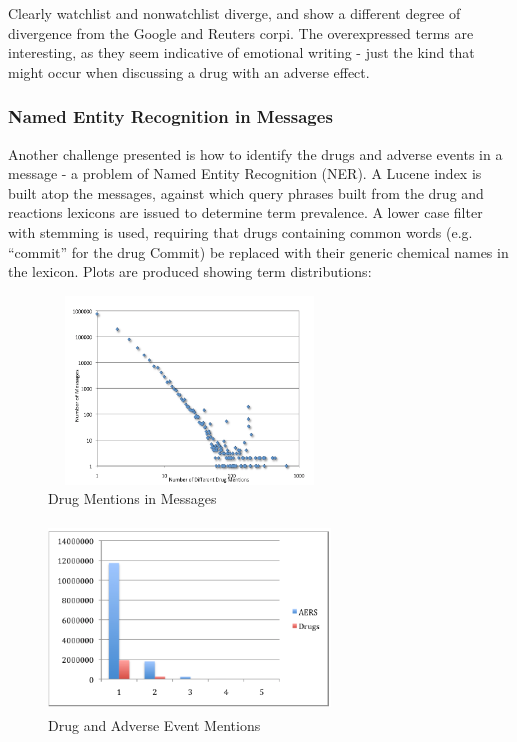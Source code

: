 \documentclass[twoside,11pt]{article}
\begin{document}
Clearly watchlist and nonwatchlist diverge, and show a different degree of divergence from the Google and Reuters corpi. The overexpressed terms are interesting, as they seem indicative of emotional writing - just the kind that might occur when discussing a drug with an adverse effect.

\subsubsection{Named Entity Recognition in Messages}
Another challenge presented is how to identify the drugs and adverse events in a message - a problem of Named Entity Recognition (NER). A Lucene index is built atop the messages, against which query phrases built from the drug and reactions lexicons are issued to determine term prevalence. A lower case filter with stemming is used, requiring that drugs containing common words (e.g. ``commit'' for the drug Commit) be replaced with their generic chemical names in the lexicon. Plots are produced showing term distributions:

\hspace{-1cm}\begin{minipage}{.5\textwidth}
  \centering
  \begin{figure}[H]
    \caption{Drug Mentions in Messages}
    \label{fig:zipfian}
    \includegraphics[width=7.5cm, height=5cm]{Figure-1-Zipfian.png}
  \end{figure}
\end{minipage}%
\hspace{.25cm}\begin{minipage}{.5\textwidth}
  \centering
  \begin{figure}[H]
    \caption{Drug and Adverse Event Mentions}
    \label{fig:mentions}
    \includegraphics[width=7.5cm, height=5cm]{Figure-2-AERS_Drugs.png}
  \end{figure}
\end{minipage}
\end{document}
